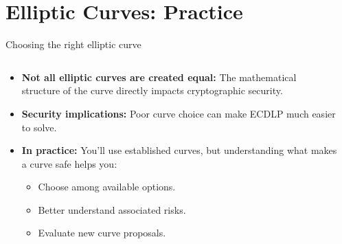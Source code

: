 \documentclass[aspectratio=169, lualatex, handout]{beamer}
\begin{document}
\section{Elliptic Curves: Practice}

\begin{frame}{Choosing the right elliptic curve}
	\begin{columns}[c]
		\begin{column}{0.5\textwidth}
			\begin{itemize}[<+->]
				\item \textbf{Not all elliptic curves are created equal:} The mathematical structure of the curve directly impacts cryptographic security.
				\item \textbf{Security implications:} Poor curve choice can make ECDLP much easier to solve.
				\item \textbf{In practice:} You'll use established curves, but understanding what makes a curve safe helps you:
				      \begin{itemize}
					      \item Choose among available options.
					      \item Better understand associated risks.
					      \item Evaluate new curve proposals.
				      \end{itemize}
			\end{itemize}
		\end{column}
		\begin{column}{0.5\textwidth}
		\end{column}
	\end{columns}
\end{frame}
\end{document}
